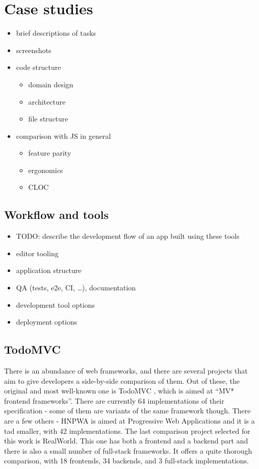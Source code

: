 \documentclass[english,odsaz]{fitthesis}
\begin{document}
\chapter{Case studies}
\label{sec:orga9df510}
\begin{itemize}
\item brief descriptions of tasks
\item screenshots
\item code structure
\begin{itemize}
\item domain design
\item architecture
\item file structure
\end{itemize}
\item comparison with JS in general
\begin{itemize}
\item feature parity
\item ergonomics
\item CLOC
\end{itemize}
\end{itemize}

\section{Workflow and tools}
\label{sec:org8dd62d1}
\begin{itemize}
\item TODO: describe the development flow of an app built using these tools

\item editor tooling
\item application structure
\item QA (tests, e2e, CI, \ldots{}), documentation
\item development tool options
\item deployment options
\end{itemize}

\section{TodoMVC}
\label{sec:orge2f7193}
There is an abundance of web frameworks, and there are several projects that aim
to give developers a side-by-side comparison of them. Out of these, the original
and most well-known one is TodoMVC \cite{todomvc}, which is aimed at ``MV* frontend
frameworks''. There are currently 64 implementations of their specification -
some of them are variants of the same framework though. There are a few others -
HNPWA is aimed at Progressive Web Applications and it is a tad smaller, with 42
implementations. The last comparison project selected for this work is
RealWorld. This one has both a frontend and a backend part and there is also a
small number of full-stack frameworks. It offers a quite thorough comparison,
with 18 frontends, 34 backends, and 3 full-stack implementations.
\end{document}
